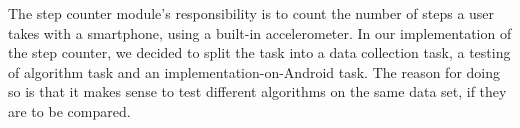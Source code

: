 
The step counter module's responsibility is to count the number of steps a user takes with a smartphone, using a built-in accelerometer. In our implementation of the step counter, we decided to split the task into a data collection task, a testing of algorithm task and an implementation-on-Android task. The reason for doing so is that it makes sense to test different algorithms on the same data set, if they are to be compared.